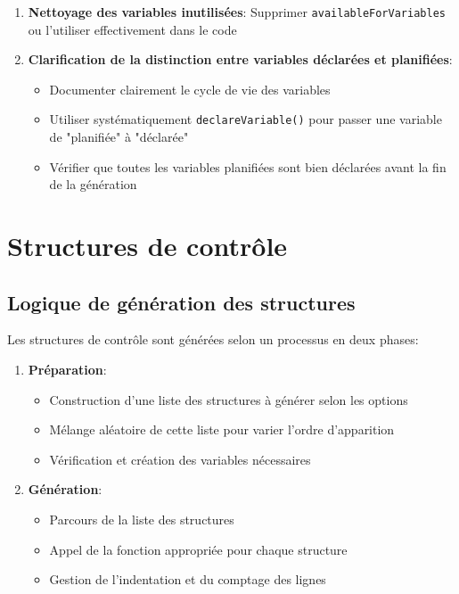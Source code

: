 \documentclass[11pt,a4paper]{article}
\begin{document}
\begin{enumerate}
    \item \textbf{Nettoyage des variables inutilisées}: Supprimer \texttt{availableForVariables} ou l'utiliser effectivement dans le code
    
    \item \textbf{Clarification de la distinction entre variables déclarées et planifiées}:
    \begin{itemize}
        \item Documenter clairement le cycle de vie des variables
        \item Utiliser systématiquement \texttt{declareVariable()} pour passer une variable de "planifiée" à "déclarée"
        \item Vérifier que toutes les variables planifiées sont bien déclarées avant la fin de la génération
    \end{itemize}
\end{enumerate}

\section{Structures de contrôle}

\subsection{Logique de génération des structures}

Les structures de contrôle sont générées selon un processus en deux phases:

\begin{enumerate}
    \item \textbf{Préparation}:
    \begin{itemize}
        \item Construction d'une liste des structures à générer selon les options
        \item Mélange aléatoire de cette liste pour varier l'ordre d'apparition
        \item Vérification et création des variables nécessaires
    \end{itemize}
    
    \item \textbf{Génération}:
    \begin{itemize}
        \item Parcours de la liste des structures
        \item Appel de la fonction appropriée pour chaque structure
        \item Gestion de l'indentation et du comptage des lignes
    \end{itemize}
\end{enumerate}
\end{document}
